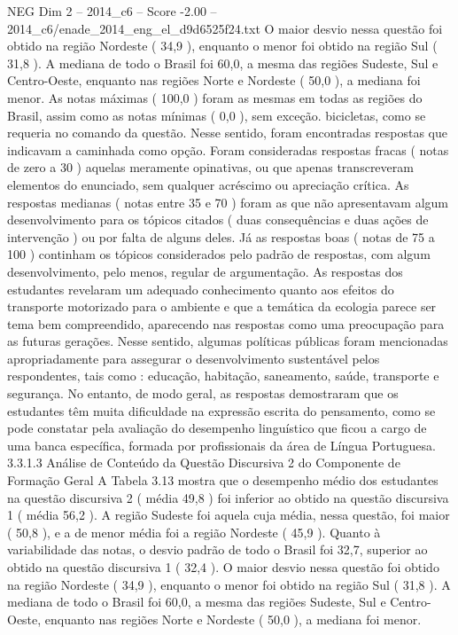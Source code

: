 \begin{textsample}{NEG Dim 2 – 2014\_c6 – Score -2.00 – 2014\_c6/enade\_2014\_eng\_el\_d9d6525f24.txt}
O maior desvio nessa questão foi obtido na região Nordeste ( 34,9 ), enquanto o menor foi obtido na região Sul ( 31,8 ).
A mediana de todo o Brasil foi 60,0, a mesma das regiões Sudeste, Sul e Centro-Oeste, enquanto nas regiões Norte e Nordeste ( 50,0 ), a mediana foi menor.
As notas máximas ( 100,0 ) foram as mesmas em todas as regiões do Brasil, assim como as notas mínimas ( 0,0 ), sem exceção. bicicletas, como se requeria no comando da questão.
Nesse sentido, foram encontradas respostas que indicavam a caminhada como opção.
Foram consideradas respostas fracas ( notas de zero a 30 ) aquelas meramente opinativas, ou que apenas transcreveram elementos do enunciado, sem qualquer acréscimo ou apreciação crítica.
As respostas medianas ( notas entre 35 e 70 ) foram as que não apresentavam algum desenvolvimento para os tópicos citados ( duas consequências e duas ações de intervenção ) ou por falta de alguns deles.
Já as respostas boas ( notas de 75 a 100 ) continham os tópicos considerados pelo padrão de respostas, com algum desenvolvimento, pelo menos, regular de argumentação.
As respostas dos estudantes revelaram um adequado conhecimento quanto aos efeitos do transporte motorizado para o ambiente e que a temática da ecologia parece ser tema bem compreendido, aparecendo nas respostas como uma preocupação para as futuras gerações.
Nesse sentido, algumas políticas públicas foram mencionadas apropriadamente para assegurar o desenvolvimento sustentável pelos respondentes, tais como : educação, habitação, saneamento, saúde, transporte e segurança.
No entanto, de modo geral, as respostas demostraram que os estudantes têm muita dificuldade na expressão escrita do pensamento, como se pode constatar pela avaliação do desempenho linguístico que ficou a cargo de uma banca específica, formada por profissionais da área de Língua Portuguesa. 3.3.1.3 Análise de Conteúdo da Questão Discursiva 2 do Componente de Formação Geral A Tabela 3.13 mostra que o desempenho médio dos estudantes na questão discursiva 2 ( média 49,8 ) foi inferior ao obtido na questão discursiva 1 ( média 56,2 ).
A região Sudeste foi aquela cuja média, nessa questão, foi maior ( 50,8 ), e a de menor média foi a região Nordeste ( 45,9 ).
Quanto à variabilidade das notas, o desvio padrão de todo o Brasil foi 32,7, superior ao obtido na questão discursiva 1 ( 32,4 ).
O maior desvio nessa questão foi obtido na região Nordeste ( 34,9 ), enquanto o menor foi obtido na região Sul ( 31,8 ).
A mediana de todo o Brasil foi 60,0, a mesma das regiões Sudeste, Sul e Centro-Oeste, enquanto nas regiões Norte e Nordeste ( 50,0 ), a mediana foi menor.

\end{textsample}

